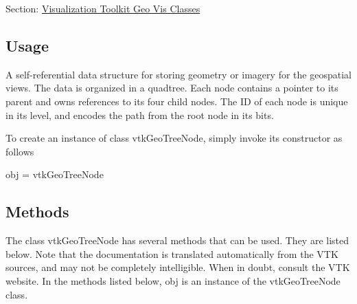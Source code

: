 Section\-: \hyperlink{sec_vtkgeovis}{Visualization Toolkit Geo Vis Classes} \hypertarget{vtkwidgets_vtkxyplotwidget_Usage}{}\subsection{Usage}\label{vtkwidgets_vtkxyplotwidget_Usage}
A self-\/referential data structure for storing geometry or imagery for the geospatial views. The data is organized in a quadtree. Each node contains a pointer to its parent and owns references to its four child nodes. The I\-D of each node is unique in its level, and encodes the path from the root node in its bits.

To create an instance of class vtk\-Geo\-Tree\-Node, simply invoke its constructor as follows \begin{DoxyVerb}  obj = vtkGeoTreeNode
\end{DoxyVerb}
 \hypertarget{vtkwidgets_vtkxyplotwidget_Methods}{}\subsection{Methods}\label{vtkwidgets_vtkxyplotwidget_Methods}
The class vtk\-Geo\-Tree\-Node has several methods that can be used. They are listed below. Note that the documentation is translated automatically from the V\-T\-K sources, and may not be completely intelligible. When in doubt, consult the V\-T\-K website. In the methods listed below, {\ttfamily obj} is an instance of the vtk\-Geo\-Tree\-Node class. 
